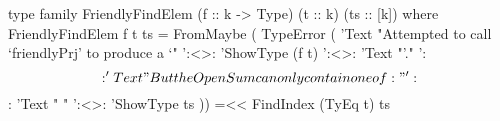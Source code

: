 \begin{code}
type family FriendlyFindElem (f :: k -> Type) (t :: k) (ts :: [k]) where
  FriendlyFindElem f t ts =
    FromMaybe
         ( TypeError
         ( 'Text "Attempted to call `friendlyPrj' to produce a `"
     ':<>: 'ShowType (f t)
     ':<>: 'Text "'."
     ':$$: 'Text "But the OpenSum can only contain one of:"
     ':$$: 'Text "  "
     ':<>: 'ShowType ts
         )) =<< FindIndex (TyEq t) ts
\end{code}
